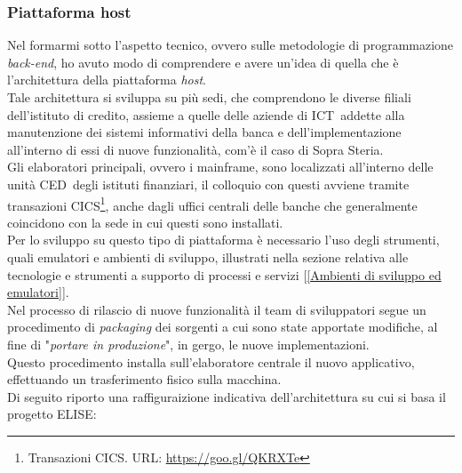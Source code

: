 \subsubsection{Piattaforma host}

Nel formarmi sotto l'aspetto tecnico, ovvero sulle metodologie di programmazione \textit{back-end}\glossario, ho avuto modo di comprendere e avere un'idea di quella che è l'architettura della piattaforma \textit{host}.\\

Tale architettura si sviluppa su più sedi, che comprendono le diverse filiali dell'istituto di credito, assieme a quelle delle aziende di ICT\glossario\ addette alla manutenzione dei sistemi informativi della banca e dell'implementazione all'interno di essi di nuove funzionalità, com'è il caso di Sopra Steria.\\

Gli elaboratori principali, ovvero i mainframe, sono localizzati all'interno delle unità CED\glossario\ degli istituti finanziari, il colloquio con questi avviene tramite transazioni CICS\glossario\footnote{Transazioni CICS. URL: \url{https://goo.gl/QKRXTe}}, anche dagli uffici centrali delle banche che generalmente coincidono con la sede in cui questi sono installati.\\

Per lo sviluppo su questo tipo di piattaforma è necessario l'uso degli strumenti, quali emulatori e ambienti di sviluppo, illustrati nella sezione relativa alle tecnologie e strumenti a supporto di processi e servizi [\ref{Ambienti di sviluppo ed emulatori}].\\

Nel processo di rilascio di nuove funzionalità il team di sviluppatori segue un procedimento di \textit{packaging} dei sorgenti a cui sono state apportate modifiche, al fine di "\textit{portare in produzione}", in gergo, le nuove implementazioni.\\

Questo procedimento installa sull'elaboratore centrale il nuovo applicativo, effettuando un trasferimento fisico sulla macchina.\\

Di seguito riporto una raffiguraizione indicativa dell'architettura su cui si basa il progetto ELISE:

